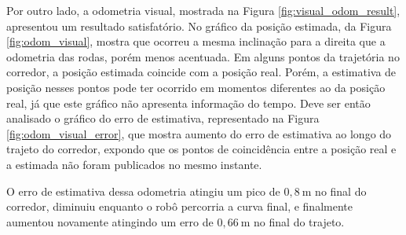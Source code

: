 \documentclass[repeatfields,xlists,xpacks,oneside,yearsonly]{ufrgscca}
\begin{document}
Por outro lado, a odometria visual, mostrada na Figura
\ref{fig:visual_odom_result}, apresentou um resultado satisfatório.
No gráfico da posição estimada, da Figura \ref{fig:odom_visual},
mostra que ocorreu a mesma inclinação para a direita que a odometria
das rodas, porém menos acentuada. Em alguns pontos da trajetória no
corredor, a posição estimada coincide com a posição real. Porém, a
estimativa de posição nesses pontos pode ter ocorrido em momentos
diferentes ao da posição real, já que este gráfico não apresenta
informação do tempo. Deve ser então analisado o gráfico do erro de
estimativa, representado na Figura \ref{fig:odom_visual_error}, que
mostra aumento do erro de estimativa ao longo do trajeto do corredor,
expondo que os pontos de coincidência entre a posição real e a
estimada não foram publicados no mesmo instante.

O erro de estimativa dessa odometria atingiu um pico de
$0,8~\si{\meter}$ no final do corredor, diminuiu enquanto o robô
percorria a curva final, e finalmente aumentou novamente atingindo um
erro de $0,66~\si{\meter}$ no final do trajeto.
\end{document}
